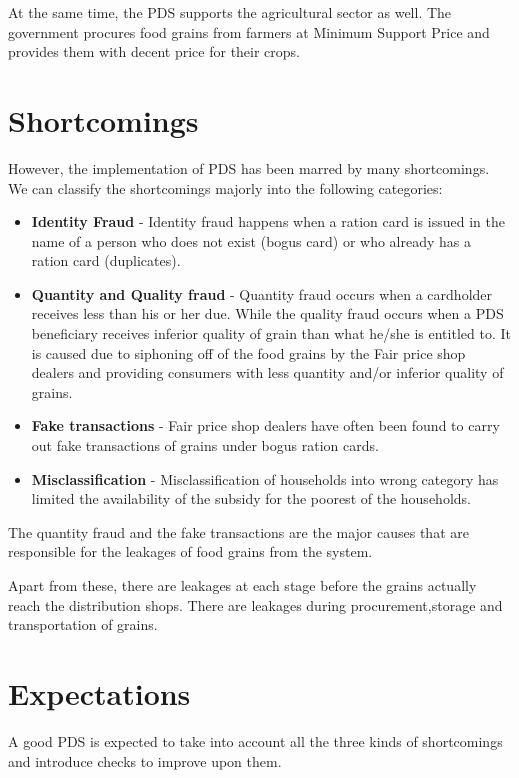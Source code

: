 \documentclass[a4paper,12pt,openany]{book}
\begin{document}
At the same time, the PDS supports the agricultural sector as well. The government procures food grains from farmers at Minimum Support Price and provides them with decent price for their crops.

\section{Shortcomings}
However, the implementation of PDS has been marred by many shortcomings. We can classify the shortcomings majorly into the following categories:
\begin{itemize}
\item \textbf{Identity Fraud} - Identity fraud happens
when a ration card is issued in the name of a person who does
not exist (bogus card) or who already has a ration card (duplicates). 

\item \textbf{Quantity and Quality fraud} - Quantity fraud occurs when a
cardholder receives less than his or her due. While the quality fraud occurs when a PDS beneficiary receives inferior quality of grain than what he/she is entitled to. It is caused due to siphoning off of the food grains by the Fair price shop dealers and providing consumers with less quantity and/or inferior quality of grains.

\item \textbf{Fake transactions} - Fair price shop dealers have often been found to carry out fake transactions of grains under bogus ration cards. 

\item \textbf{Misclassification} - Misclassification of households into wrong category has limited the availability of the subsidy for the poorest of the households.
\end{itemize}

The quantity fraud and the fake transactions are the major causes that are responsible for the leakages of food grains from the system.

Apart from these, there are leakages at each stage before the grains actually reach the distribution shops. There are leakages during procurement,storage and transportation of grains.

\section{Expectations}
A good PDS is expected to take into account all the three kinds of shortcomings and introduce checks to improve upon them.
\end{document}

